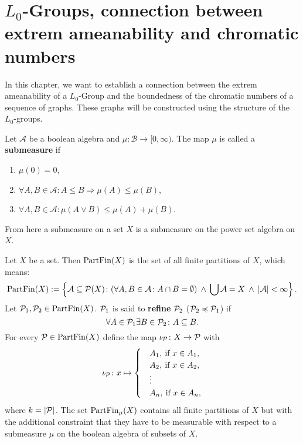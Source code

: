 \section{$L_0$-Groups, connection between extrem ameanability and chromatic numbers}
In this chapter, we want to establish a connection between the extrem ameanability of a $L_0$-Group and the boundedness of the chromatic numbers of a sequence of graphs.
These graphs will be constructed using the structure of the $L_0$-groups.

\begin{defin}
  Let $\mathcal{A}$ be a boolean algebra and $\mu\colon \mathcal{B} \to [0, \infty)$. The map $\mu$ is called a \textbf{submeasure} if
  \begin{enumerate}
    \item $\mu(0) = 0$,
    \item $\forall A, B \in \mathcal{A}\colon A \leq B \Rightarrow \mu(A) \leq \mu(B)$,
    \item $\forall A, B \in \mathcal{A}\colon \mu(A \lor B) \leq \mu(A) + \mu(B)$.
  \end{enumerate}
\end{defin}

From here a submeasure on a set $X$ is a submeasure on the power set algebra on $X$.

\begin{defin}
  Let $X$ be a set. Then ${\rm PartFin}(X)$ is the set of all finite partitions of $X$, which means:
  \begin{equation*}
    {\rm PartFin}(X) := \left\{ \mathcal{A} \subseteq \P(X)\colon (\forall A,B \in \mathcal{A}\colon A \cap B = \emptyset) \: \land \: \bigcup\mathcal{A} = X \: \land \: \left| \mathcal{A} \right| < \infty \right\}.
  \end{equation*}
  Let $\P_1, \P_2 \in {\rm PartFin}(X)$. $\P_1$ is said to \textbf{refine} $\P_2$ ($\P_2 \preccurlyeq \P_1$) if
  \begin{equation*}
    \forall A \in \P_1\exists B \in \P_2\colon A \subseteq B.
  \end{equation*}
  For every $\P \in {\rm PartFin}(X)$ define the map $\iota_\P\colon X \to \P$ with
  \begin{equation*}
    \iota_\P\colon x \mapsto \begin{cases}
      &A_1, \: \text{if } x \in A_1, \\
      &A_2, \: \text{if } x \in A_2, \\
      &\vdots \\
      &A_n, \: \text{if } x \in A_n,
    \end{cases}
  \end{equation*}
  where $k = \left|\P\right|$.    
  The set ${\rm PartFin}_\mu(X)$ contains all finite partitions of $X$ but with the additional constraint that they have to be measurable with respect to a submeasure $\mu$ on the boolean algebra of subsets of $X$. 
\end{defin}

